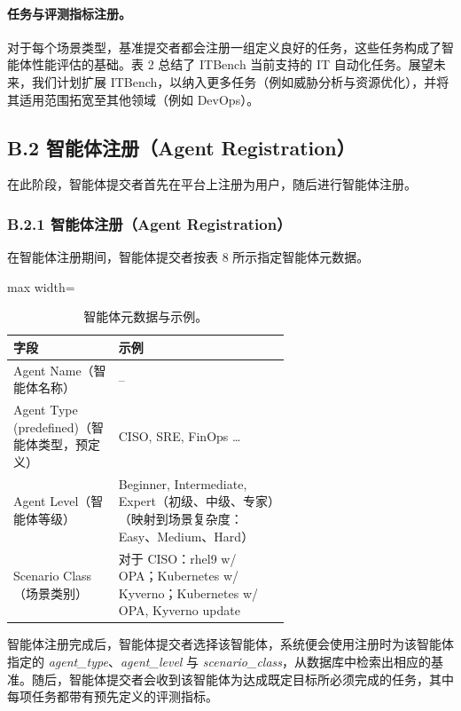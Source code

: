\paragraph{任务与评测指标注册。}
对于每个场景类型，基准提交者都会注册一组定义良好的任务，这些任务构成了智能体性能评估的基础。表 2 总结了 ITBench 当前支持的 IT 自动化任务。展望未来，我们计划扩展 ITBench，以纳入更多任务（例如威胁分析与资源优化），并将其适用范围拓宽至其他领域（例如 DevOps）。

\subsection{B.2 智能体注册（Agent Registration）}

在此阶段，智能体提交者首先在平台上注册为用户，随后进行智能体注册。

\subsubsection{B.2.1 智能体注册（Agent Registration）}

在智能体注册期间，智能体提交者按表 8 所示指定智能体元数据。

\begin{table}[H]
\centering
\caption{智能体元数据与示例。}
\label{tab:8}
\begin{adjustbox}{max width=\linewidth}
\begin{tabular}{@{}lp{0.62\linewidth}@{}}
\toprule
\textbf{字段} & \textbf{示例} \\
\midrule
Agent Name（智能体名称） & -- \\
Agent Type (predefined)（智能体类型，预定义） & CISO, SRE, FinOps \ldots \\
Agent Level（智能体等级） & Beginner, Intermediate, Expert（初级、中级、专家）（映射到场景复杂度：Easy、Medium、Hard） \\
Scenario Class（场景类别） & 对于 CISO：rhel9 w/ OPA；Kubernetes w/ Kyverno；Kubernetes w/ OPA, Kyverno update \\
\bottomrule
\end{tabular}
\end{adjustbox}
\end{table}

智能体注册完成后，智能体提交者选择该智能体，系统便会使用注册时为该智能体指定的 \textit{agent\_type}、\textit{agent\_level} 与 \textit{scenario\_class}，从数据库中检索出相应的基准。随后，智能体提交者会收到该智能体为达成既定目标所必须完成的任务，其中每项任务都带有预先定义的评测指标。

